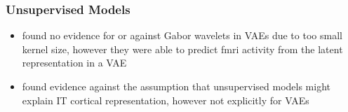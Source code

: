 \subsubsection{Unsupervised Models}
\begin{itemize}
    \item \citet{han2019variational} found no evidence for or against Gabor wavelets in \acp{VAE} due to too small kernel size, however they were able to predict fmri activity from the latent representation in a VAE
    \item \citet{khaligh2014deep} found evidence against the assumption that unsupervised models might explain \ac{IT} cortical representation, however not explicitly for \acp{VAE}
\end{itemize}